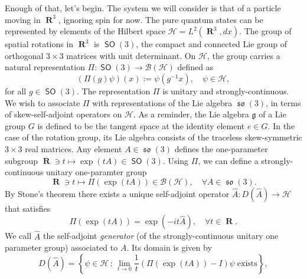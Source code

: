\documentclass[a4paper]{article}
\DeclareMathOperator{\R}{\mathbf{R}}
\DeclareMathOperator{\SO}{\mathsf{SO}}
\DeclareMathOperator{\so}{\mathfrak{so}}
\begin{document}
    Enough of that, let's begin. The system we will consider
    is that of a particle moving in $\R^3$, ignoring spin
    for now. The pure quantum states can be represented by
    elements of the Hilbert space $\mathcal{H} =
    L^2(\R^3,dx)$. The group of spatial rotations in $\R^3$
    is $\SO(3)$, the compact and connected Lie group of
    orthogonal $3 \times 3$ matrices with unit determinant.
    On $\mathcal{H}$, the group carries a natural
    representation $\Pi : \SO(3) \to
    \mathcal{B}(\mathcal{H})$ defined as
    \begin{equation}
        \label{eqn:SO(3)-scur}
        (\Pi(g) \psi)(x)
        :=
        \psi(g^{-1} x),
        \quad
        \psi \in \mathcal{H},
    \end{equation}
    for all $g \in \SO(3)$. The representation $\Pi$ is
    unitary and strongly-continuous.  We wish to associate
    $\Pi$ with representations of the Lie algebra $\so(3)$,
    in terms of skew-self-adjoint operators on
    $\mathcal{H}$.  As a reminder, the Lie algebra
    $\mathfrak{g}$ of a Lie group $G$ is defined to be the
    tangent space at the identity element $e \in G$. In the
    case of the rotation group, its Lie algebra consists of
    the traceless skew-symmetric $3 \times 3$ real matrices.
    Any element $A \in \so(3)$ defines the one-parameter
    subgroup $\R \ni t \mapsto \exp(t A) \in \SO(3)$. Using
    $\Pi$, we can define a strongly-continuous unitary
    one-paramter group 
    \begin{equation}
        \label{eqn:scuopg}
        \R \ni t
        \mapsto
        \Pi(\exp(t A))
        \in \mathcal{B}(\mathcal{H}), \quad \forall A \in
        \so(3).
    \end{equation}
    By Stone's theorem there exists a unique self-adjoint
    operator $\hat{A} : D(\hat{A}) \to \mathcal{H}$ that
    satisfies
    \begin{equation}
        \Pi(\exp(tA))
        = \exp\left(-it \hat{A}\right),
        \quad
        \forall t \in \R.
    \end{equation}
    We call $\hat{A}$ the self-adjoint \textit{generator}
    (of the strongly-continuous unitary one parameter group)
    associated to $A$. Its domain is given by
    \begin{equation}
        D(\hat{A})
        =
        \left\{
            \psi \in \mathcal{H}
            \, : \,
            \lim_{t \to 0} \frac{1}{t}(\Pi(\exp(tA)) -
            I)\psi
            \;
            \text{exists}
        \right\},
    \end{equation}
\end{document}
